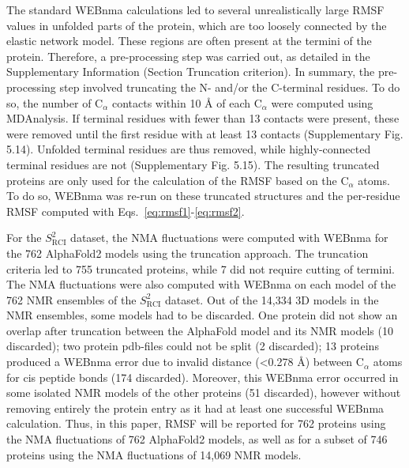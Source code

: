 The standard WEBnma calculations led to several unrealistically large RMSF values in unfolded parts of the protein, which are too loosely connected by the elastic network model. These regions are often present at the termini of the protein. Therefore, a pre-processing step was carried out, as detailed in the Supplementary Information (Section Truncation criterion). In summary, the pre-processing step involved truncating the N- and/or the C-terminal residues. To do so, the number of C$_\alpha$ contacts within 10 Å of each C$_\alpha$ were computed using MDAnalysis. If terminal residues with fewer than 13 contacts were present, these were removed until the first residue with at least 13 contacts (Supplementary Fig. 5.14).
Unfolded terminal residues are thus removed, while highly-connected terminal residues are not (Supplementary Fig. 5.15).
The resulting truncated proteins are only used for the calculation of the RMSF based on the C$_\alpha$ atoms. To do so, WEBnma was re-run on these truncated structures and the per-residue RMSF computed with Eqs.~\ref{eq:rmsf1}-\ref{eq:rmsf2}.


For the $S^2_{\text{RCI}}$ dataset, the NMA fluctuations were computed with WEBnma for the 762 AlphaFold2 models using the truncation approach. The truncation criteria led to 755 truncated proteins, while 7 did not require cutting of termini.
The NMA fluctuations were also computed with WEBnma on each model of the 762 NMR ensembles of the $S^2_{\text{RCI}}$ dataset. 
Out of the 14,334 3D models in the NMR ensembles, some models had to be discarded.
One protein did not show an overlap after truncation between the AlphaFold model and its NMR models (10 discarded); two protein pdb-files could not be split (2 discarded); 13 proteins produced a WEBnma error due to invalid distance (\textless 0.278 \AA) between C$_\alpha$ atoms for cis peptide bonds (174 discarded). Moreover, this WEBnma error occurred in some isolated NMR models of the other proteins (51 discarded), however without removing entirely the protein entry as it had at least one successful WEBnma calculation.
Thus, in this paper, RMSF will be reported for 762 proteins using the NMA fluctuations of 762 AlphaFold2 models, as well as for a subset of 746 proteins using the NMA fluctuations of 14,069 NMR models.

